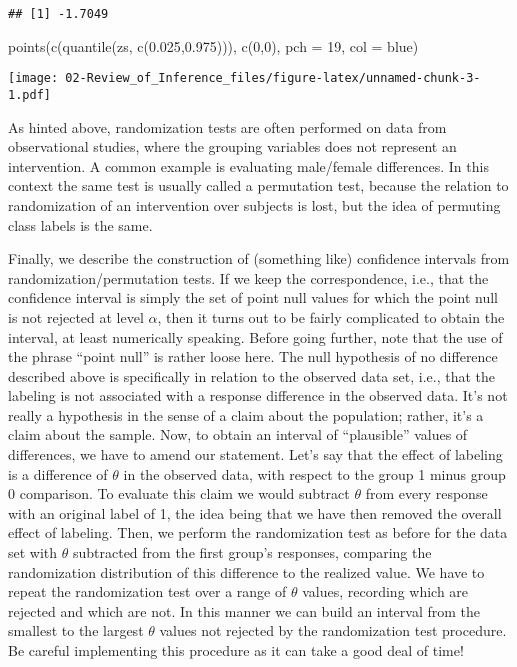 \documentclass[
]{book}
\newenvironment{Shaded}{\begin{snugshade}}{\end{snugshade}}
\newcommand{\AttributeTok}[1]{\textcolor[rgb]{0.77,0.63,0.00}{#1}}
\newcommand{\DecValTok}[1]{\textcolor[rgb]{0.00,0.00,0.81}{#1}}
\newcommand{\FloatTok}[1]{\textcolor[rgb]{0.00,0.00,0.81}{#1}}
\newcommand{\FunctionTok}[1]{\textcolor[rgb]{0.00,0.00,0.00}{#1}}
\newcommand{\NormalTok}[1]{#1}
\newcommand{\StringTok}[1]{\textcolor[rgb]{0.31,0.60,0.02}{#1}}
\theoremstyle{definition}
\theoremstyle{definition}
\theoremstyle{definition}
\theoremstyle{definition}
\theoremstyle{remark}
\begin{document}
\begin{verbatim}
## [1] -1.7049
\end{verbatim}

\begin{Shaded}
\begin{Highlighting}[]
\FunctionTok{points}\NormalTok{(}\FunctionTok{c}\NormalTok{(}\FunctionTok{quantile}\NormalTok{(zs, }\FunctionTok{c}\NormalTok{(}\FloatTok{0.025}\NormalTok{,}\FloatTok{0.975}\NormalTok{))), }\FunctionTok{c}\NormalTok{(}\DecValTok{0}\NormalTok{,}\DecValTok{0}\NormalTok{), }\AttributeTok{pch =} \DecValTok{19}\NormalTok{, }\AttributeTok{col =} \StringTok{\textquotesingle{}blue\textquotesingle{}}\NormalTok{)}
\end{Highlighting}
\end{Shaded}

\texttt{[image: 02-Review\_of\_Inference\_files/figure-latex/unnamed-chunk-3-1.pdf]}

As hinted above, randomization tests are often performed on data from observational studies, where the grouping variables does not represent an intervention. A common example is evaluating male/female differences. In this context the same test is usually called a permutation test, because the relation to randomization of an intervention over subjects is lost, but the idea of permuting class labels is the same.

Finally, we describe the construction of (something like) confidence intervals from randomization/permutation tests. If we keep the correspondence, i.e., that the confidence interval is simply the set of point null values for which the point null is not rejected at level \(\alpha\), then it turns out to be fairly complicated to obtain the interval, at least numerically speaking. Before going further, note that the use of the phrase ``point null'' is rather loose here. The null hypothesis of no difference described above is specifically in relation to the observed data set, i.e., that the labeling is not associated with a response difference in the observed data. It's not really a hypothesis in the sense of a claim about the population; rather, it's a claim about the sample. Now, to obtain an interval of ``plausible'' values of differences, we have to amend our statement. Let's say that the effect of labeling is a difference of \(\theta\) in the observed data, with respect to the group 1 minus group 0 comparison. To evaluate this claim we would subtract \(\theta\) from every response with an original label of 1, the idea being that we have then removed the overall effect of labeling. Then, we perform the randomization test as before for the data set with \(\theta\) subtracted from the first group's responses, comparing the randomization distribution of this difference to the realized value. We have to repeat the randomization test over a range of \(\theta\) values, recording which are rejected and which are not. In this manner we can build an interval from the smallest to the largest \(\theta\) values not rejected by the randomization test procedure. Be careful implementing this procedure as it can take a good deal of time!
\end{document}
